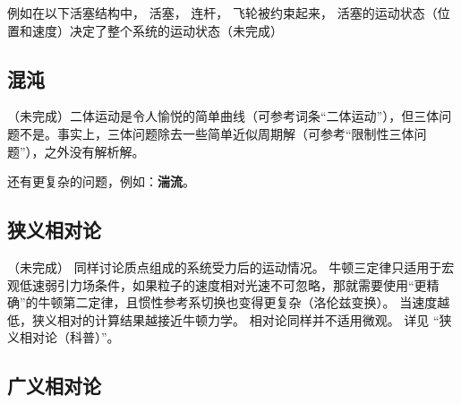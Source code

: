 例如在以下活塞结构中， 活塞， 连杆， 飞轮被约束起来， 活塞的运动状态（位置和速度）决定了整个系统的运动状态（未完成）%

\subsection{混沌}
（未完成）二体运动是令人愉悦的简单曲线（可参考词条“二体运动”），但三体问题不是。事实上，三体问题除去一些简单近似周期解（可参考“限制性三体问题”），之外没有解析解。

还有更复杂的问题，例如：\textbf{湍流}。

\subsection{狭义相对论}
（未完成）
同样讨论质点组成的系统受力后的运动情况。 牛顿三定律只适用于宏观低速弱引力场条件，如果粒子的速度相对光速不可忽略，那就需要使用“更精确”的牛顿第二定律，且惯性参考系切换也变得更复杂（洛伦兹变换）。 当速度越低，狭义相对的计算结果越接近牛顿力学。 相对论同样并不适用微观。 详见 “狭义相对论（科普）”。

\subsection{广义相对论}
